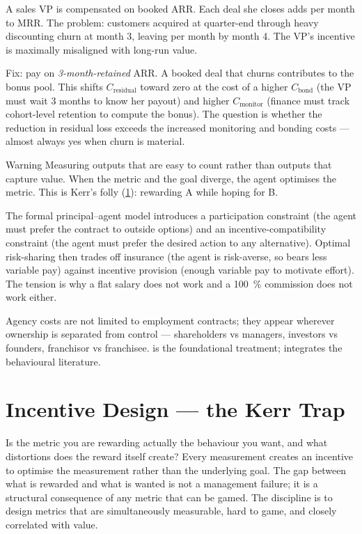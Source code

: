 \begin{example}
A sales VP is compensated on booked ARR. Each deal she closes adds  per month to MRR. The problem: customers acquired at quarter-end through heavy discounting churn at month 3, leaving  per month by month 4. The VP's incentive is maximally misaligned with long-run value.

Fix: pay on \emph{3-month-retained} ARR. A booked deal that churns contributes  to the bonus pool. This shifts \(C_{\text{residual}}\) toward zero at the cost of a higher \(C_{\text{bond}}\) (the VP must wait 3 months to know her payout) and higher \(C_{\text{monitor}}\) (finance must track cohort-level retention to compute the bonus). The question is whether the reduction in residual loss exceeds the increased monitoring and bonding costs --- almost always yes when churn is material.
\end{example}

\begin{admonition}{Warning}
Measuring outputs that are easy to count rather than outputs that capture value. When the metric and the goal diverge, the agent optimises the metric. This is Kerr's folly (\cref{sec:kerr-trap}): rewarding A while hoping for B.
\end{admonition}

The formal principal--agent model introduces a participation constraint (the agent must prefer the contract to outside options) and an incentive-compatibility constraint (the agent must prefer the desired action to any alternative). Optimal risk-sharing then trades off insurance (the agent is risk-averse, so bears less variable pay) against incentive provision (enough variable pay to motivate effort). The tension is why a flat salary does not work and a \qty{100}{\percent} commission does not work either.

Agency costs are not limited to employment contracts; they appear wherever ownership is separated from control --- shareholders vs managers, investors vs founders, franchisor vs franchisee. \textcite{jensen1976agency} is the foundational treatment; \textcite{robbins2022} integrates the behavioural literature.

\section{Incentive Design --- the Kerr Trap}\label{sec:kerr-trap}

Is the metric you are rewarding actually the behaviour you want, and what distortions does the reward itself create? Every measurement creates an incentive to optimise the measurement rather than the underlying goal. The gap between what is rewarded and what is wanted is not a management failure; it is a structural consequence of any metric that can be gamed. The discipline is to design metrics that are simultaneously measurable, hard to game, and closely correlated with value.

